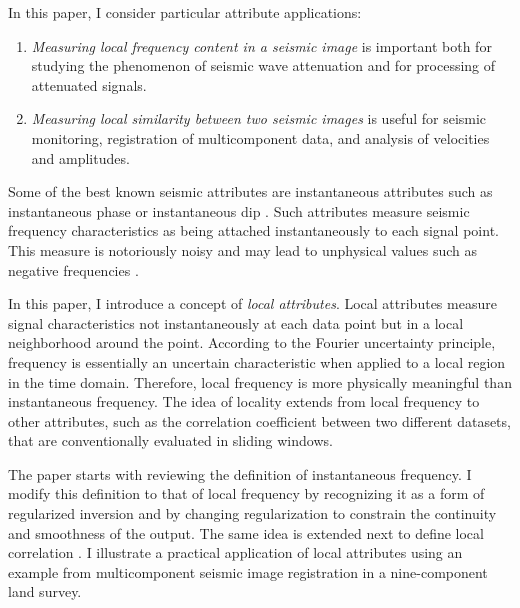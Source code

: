 In this paper, I consider   particular attribute applications:
\begin{enumerate}
\item \emph{Measuring local frequency content in a seismic image}
  is important both for studying the phenomenon of seismic wave
  attenuation and for processing of attenuated signals.
\item \emph{Measuring local similarity between two seismic images} is
  useful for seismic monitoring, registration of multicomponent data,
  and analysis of velocities and amplitudes.
\end{enumerate}

Some of the best known seismic attributes are instantaneous attributes
such as instantaneous phase or instantaneous dip
\cite[]{GEO44-06-10411063,GEO57-11-15201524,GEO58-03-04190428}. 
Such
attributes measure seismic frequency characteristics as being attached
instantaneously to each signal point. This measure is notoriously
noisy and may lead to unphysical values such as negative frequencies
\cite[]{TLE10-07-00260032}.

In this paper, I introduce a concept of \emph{local attributes}. Local
attributes measure signal characteristics not instantaneously at each
data point but in a local neighborhood around the point. According to
the Fourier uncertainty principle, frequency is essentially an
uncertain characteristic when applied to a local region in the time
domain. Therefore, local frequency is more physically meaningful than
instantaneous frequency. The idea of locality extends from local
frequency to other attributes, such as the correlation coefficient
between two different datasets, that are conventionally evaluated in
sliding windows.

The paper starts with reviewing the definition of instantaneous
frequency. I modify this definition to that of local frequency by
recognizing it as a form of regularized inversion and by changing
regularization to constrain the continuity and smoothness of the
output. The same idea is extended next to define local correlation . I illustrate a practical application of local
attributes using an example from multicomponent seismic image
registration in a nine-component land survey.


